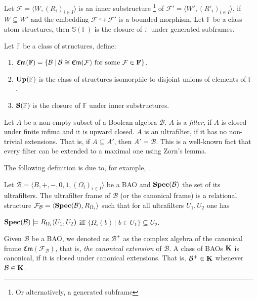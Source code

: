 \documentclass[a4paper]{article}
\theoremstyle{defin}
\theoremstyle{theorem}
\theoremstyle{claim}
\theoremstyle{prop}
\theoremstyle{lemma}
\theoremstyle{fact}
\theoremstyle{ex}
\theoremstyle{col}
\begin{document}
\begin{defin} Let $\mathcal{F} = \langle W, (R_{i})_{i \in I} \rangle$ is an inner substructure \footnote{Or alternatively, a generated subframe} of $\mathcal{F}' = \langle W', ({R'}_{i})_{i \in I} \rangle$, if $W \subseteq W'$ and the embedding $\mathcal{F} \hookrightarrow \mathcal{F}'$ is a bounded morphism. Let $\mathbb{F}$ be a class atom structures, then $\mathbb{S}(\mathbb{F})$ is the closure of $\mathbb{F}$ under generated subframes.
\end{defin}

Let $\mathbb{F}$ be a class of structures, define:
\begin{enumerate}
\item $\mathfrak{Cm}(\mathbb{F}) = \{ \mathcal{B} \: | \: \mathcal{B} \cong \mathfrak{Cm}(\mathcal{F}) \text{ for some $\mathcal{F} \in {\bf F}$}\}$.
\item ${\bf Up}(\mathbb{F})$ is the class of structures isomorphic to disjoint unions of elements of $\mathbb{F}$.
\item ${\bf S}(\mathbb{F})$ is the closure of $\mathbb{F}$ under inner substructures.
\end{enumerate}

Let $A$ be a non-empty subset of a Boolean algebra $\mathcal{B}$, $A$ is a \emph{filter}, if $A$ is closed under finite infima and it is upward closed. $A$ is an ultrafilter, if it has no non-trivial extensions. That is, if $A \subseteq A'$, then $A' = \mathcal{B}$. This is a well-known fact that every filter can be extended to a maximal one using Zorn's lemma.

The following definition is due to, for example, \cite[Definition 5.40]{venema2010}.

\begin{defin}
  Let $\mathcal{B} = \langle B, +, -, 0, 1, (\Omega_i)_{i \in I} \rangle$ be a BAO and ${\bf Spec}(\mathcal{B})$ the set of its ultrafilters. The ultrafilter frame of $\mathcal{B}$ (or the canonical frame) is a relational structure $\mathcal{F}_{\mathcal{B}} = \langle {\bf Spec}(\mathcal{B}), R_{\Omega_i} \rangle$ such that for all ultrafilters $U_1, U_2$ one has
  \begin{center}
    ${\bf Spec}(\mathcal{B}) \models R_{\Omega_i}(U_1, U_2)$ iff $\{ \Omega_i(b) \: | \: b \in U_1 \} \subseteq U_2$.
  \end{center}
\end{defin}

Given $\mathcal{B}$ be a BAO, we denoted as $\mathcal{B}^{+}$ as the complex algebra of the canonical frame $\mathfrak{Cm}(\mathcal{F}_{\mathcal{B}})$, that is, \emph{the canonical extension} of $\mathcal{B}$.
A class of BAOs ${\bf K}$ is canonical, if it is closed under canonical extensions. That is, $\mathcal{B}^{+} \in {\bf K}$ whenever $\mathcal{B} \in {\bf K}$.
\end{document}
